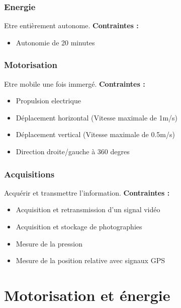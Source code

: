 \documentclass[a4paper,11pt]{report}
\begin{document}
						\subsection{Energie}
								Etre entièrement autonome. \newline
								\textbf{Contraintes :}
								\begin{itemize}
										\item Autonomie de 20 minutes
								\end{itemize}

						\subsection{Motorisation}
								Etre mobile une fois immergé. \newline
								\textbf{Contraintes :}
								\begin{itemize}
										\item Propulsion electrique
										\item Déplacement horizontal (Vitesse maximale de 1m/s)
										\item Déplacement vertical (Vitesse maximale de 0.5m/s)
										\item Direction droite/gauche à 360 degres   \newline \newline
								\end{itemize}

						\subsection{Acquisitions}
								Acquérir et transmettre l'information. \newline
								\textbf{Contraintes :}
								\begin{itemize}
										\item Acquisition et retransmission d'un signal vidéo
										\item Acquisition et stockage de photographies
										\item Mesure de la pression
										\item Mesure de la position relative avec signaux GPS
								\end{itemize}
								
\chapter{Motorisation et énergie}
\end{document}

